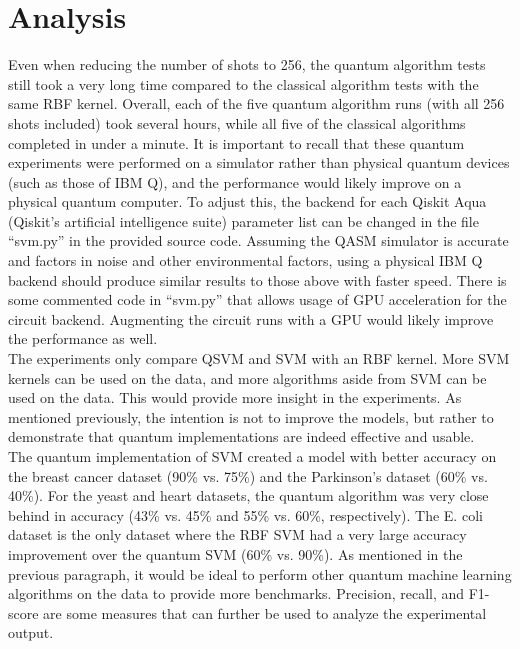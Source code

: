 \documentclass{article}
\begin{document}
\section*{Analysis}
  Even when reducing the number of shots to 256, the quantum algorithm tests still took a very long time compared to the classical algorithm tests with the same RBF kernel. Overall, each of the five quantum algorithm runs (with all 256 shots included) took several hours, while all five of the classical algorithms completed in under a minute. It is important to recall that these quantum experiments were performed on a simulator rather than physical quantum devices (such as those of IBM Q), and the performance would likely improve on a physical quantum computer. To adjust this, the backend for each Qiskit Aqua (Qiskit's artificial intelligence suite) parameter list can be changed in the file ``svm.py'' in the provided source code. Assuming the QASM simulator is accurate and factors in noise and other environmental factors, using a physical IBM Q backend should produce similar results to those above with faster speed. There is some commented code in ``svm.py'' that allows usage of GPU acceleration for the circuit backend. Augmenting the circuit runs with a GPU would likely improve the performance as well. \\

  The experiments only compare QSVM and SVM with an RBF kernel. More SVM kernels can be used on the data, and more algorithms aside from SVM can be used on the data. This would provide more insight in the experiments. As mentioned previously, the intention is not to improve the models, but rather to demonstrate that quantum implementations are indeed effective and usable. \\

  The quantum implementation of SVM created a model with better accuracy on the breast cancer dataset (90\% vs. 75\%) and the Parkinson's dataset (60\% vs. 40\%). For the yeast and heart datasets, the quantum algorithm was very close behind in accuracy (43\% vs. 45\% and 55\% vs. 60\%, respectively). The E. coli dataset is the only dataset where the RBF SVM had a very large accuracy improvement over the quantum SVM (60\% vs. 90\%). As mentioned in the previous paragraph, it would be ideal to perform other quantum machine learning algorithms on the data to provide more benchmarks. Precision, recall, and F1-score are some measures that can further be used to analyze the experimental output. \\
\end{document}
